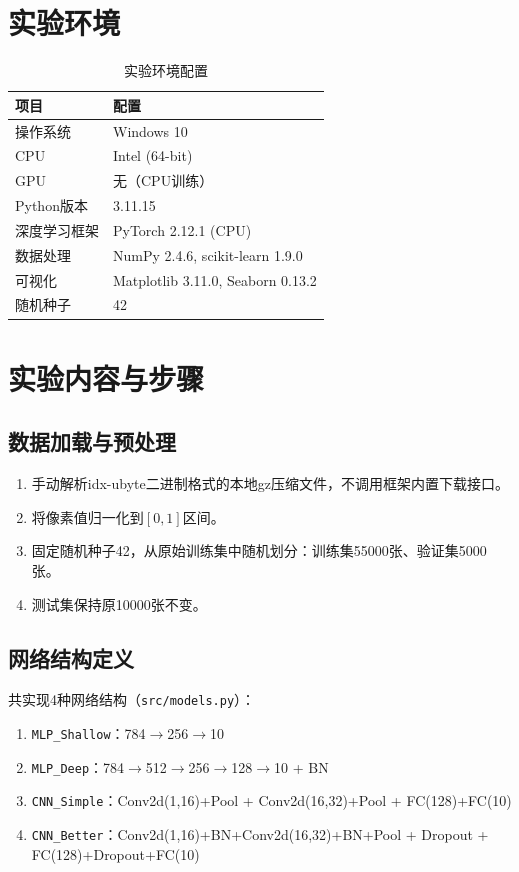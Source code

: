 \documentclass[12pt,a4paper]{article}
\begin{document}
\section{实验环境}

\begin{table}[H]
\centering
\caption{实验环境配置}
\vspace{0.3cm}
\begin{tabular}{ll}
\toprule
\textbf{项目} & \textbf{配置} \\
\midrule
操作系统 & Windows 10 \\
CPU & Intel (64-bit) \\
GPU & 无（CPU训练） \\
Python版本 & 3.11.15 \\
深度学习框架 & PyTorch 2.12.1 (CPU) \\
数据处理 & NumPy 2.4.6, scikit-learn 1.9.0 \\
可视化 & Matplotlib 3.11.0, Seaborn 0.13.2 \\
随机种子 & 42 \\
\bottomrule
\end{tabular}
\end{table}

\section{实验内容与步骤}

\subsection{数据加载与预处理}
\begin{enumerate}
    \item 手动解析idx-ubyte二进制格式的本地gz压缩文件，不调用框架内置下载接口。
    \item 将像素值归一化到$[0,1]$区间。
    \item 固定随机种子42，从原始训练集中随机划分：训练集55000张、验证集5000张。
    \item 测试集保持原10000张不变。
\end{enumerate}

\subsection{网络结构定义}
共实现4种网络结构（\texttt{src/models.py}）：
\begin{enumerate}
    \item \texttt{MLP\_Shallow}：784$\rightarrow$256$\rightarrow$10
    \item \texttt{MLP\_Deep}：784$\rightarrow$512$\rightarrow$256$\rightarrow$128$\rightarrow$10 + BN
    \item \texttt{CNN\_Simple}：Conv2d(1,16)+Pool + Conv2d(16,32)+Pool + FC(128)+FC(10)
    \item \texttt{CNN\_Better}：Conv2d(1,16)+BN+Conv2d(16,32)+BN+Pool + Dropout + FC(128)+Dropout+FC(10)
\end{enumerate}
\end{document}
